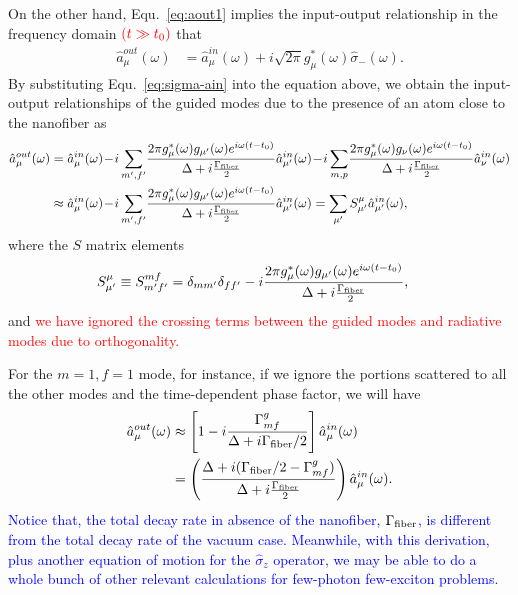 \documentclass[preprint,aps,pra,onecolumn]{revtex4-1} %
\begin{document}
On the other hand, Equ.~\eqref{eq:aout1} implies the input-output relationship in the frequency domain $\mathbin{\color{red}{(t\gg t_0)}}$ that
\begin{align}
\hat{a}^{out}_\mu(\omega ) &= \hat{a}^{in}_\mu(\omega) +i \sqrt{2\pi}g_\mu^*(\omega)\hat{\sigma}_-(\omega). 
\end{align}
By substituting Equ.~\eqref{eq:sigma-ain} into the equation above, we obtain the input-output relationships of the guided modes due to the presence of an atom close to the nanofiber as
\begin{align}
\hat{a}^{out}_\mu(\omega) &= \hat{a}^{in}_\mu (\omega) \!-\! i\sum_{m',f'}\!\frac{2\pi g_\mu^*(\omega)g_{\mu'}(\omega)e^{i\omega(t-t_0)}}{\Delta+i\frac{\Gamma_{\rm fiber}}{2}}\hat{a}^{in}_{\mu'}(\omega) \!-\! i\sum_{m,p}\!\frac{2\pi g_\mu^*(\omega)g_{\nu}(\omega)e^{i\omega(t-t_0)}}{\Delta+i\frac{\Gamma_{\rm fiber}}{2}}\hat{a}^{in}_{\nu}(\omega)\\
&\approx \hat{a}^{in}_\mu (\omega) \!-\! i\sum_{m',f'}\!\frac{2\pi g_\mu^*(\omega)g_{\mu'}(\omega)e^{i\omega(t-t_0)}}{\Delta+i\frac{\Gamma_{\rm fiber}}{2}}\hat{a}^{in}_{\mu'}(\omega)=\sum_{\mu'}S^\mu_{\mu'}\hat{a}^{in}_{\mu'}(\omega),
\end{align}
where the $S$ matrix elements
\begin{align}\label{eq:Smfmft}
S^\mu_{\mu'} &\equiv S^{mf}_{m'f'}=\delta_{mm'}\delta_{ff'}-i\frac{2\pi g_\mu^*(\omega)g_{\mu'}(\omega)e^{i\omega(t-t_0)}}{\Delta+i\frac{\Gamma_{\rm fiber}}{2}},
\end{align}
and \textcolor{red}{we have ignored the crossing terms between the guided modes and radiative modes due to orthogonality.} 

For the $m=1,f=1$ mode, for instance, if we ignore the portions scattered to all the other modes and the time-dependent phase factor, we will have 
\begin{align}
\hat{a}_{\mu}^{out}(\omega) &\approx \left[ 1- i\frac{\Gamma^g_{mf}}{\Delta+i\Gamma_{\rm fiber}/2}\right] \hat{a}^{in}_\mu(\omega) \\
&= \left(\frac{\Delta+i(\Gamma_{\rm fiber}/2-\Gamma^g_{mf})}{\Delta+i\frac{\Gamma_{\rm fiber}}{2}} \right)\hat{a}^{in}_\mu(\omega).
\end{align}
\textcolor{blue}{Notice that, the total decay rate in absence of the nanofiber, $\Gamma_{\rm fiber}$, is different from the total decay rate of the vacuum case. Meanwhile, with this derivation, plus another equation of motion for the $\hat{\sigma}_z$ operator, we may be able to do a whole bunch of other relevant calculations for few-photon few-exciton problems. }
\end{document}
